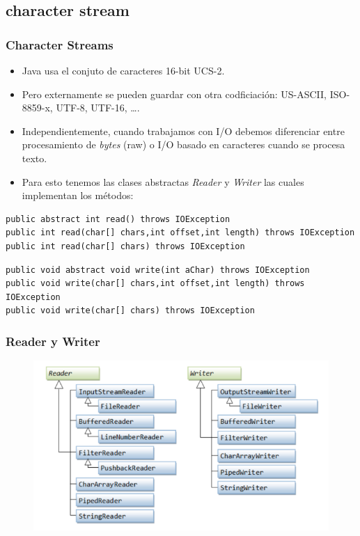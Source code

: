 \documentclass{beamer}
\begin{document}
\subsection{character stream}
\begin{frame}[fragile]
\frametitle{Character Streams}
\begin{itemize}[<+->]
\item Java usa el conjuto de caracteres 16-bit UCS-2.
\item Pero externamente se pueden guardar con otra codficiación:  US-ASCII, ISO-8859-x, UTF-8, UTF-16, \dots.
\item Independientemente, cuando trabajamos con I/O debemos diferenciar entre procesamiento de \emph{bytes} (raw) o I/O basado en caracteres cuando se procesa texto.
\item Para esto tenemos las clases abstractas \emph{Reader} y \emph{Writer} las cuales implementan los métodos:
\end{itemize}
\pause
\begin{footnotesize}
\begin{verbatim}
public abstract int read() throws IOException
public int read(char[] chars,int offset,int length) throws IOException
public int read(char[] chars) throws IOException
\end{verbatim}
\pause
\begin{verbatim}
public void abstract void write(int aChar) throws IOException
public void write(char[] chars,int offset,int length) throws IOException
public void write(char[] chars) throws IOException
\end{verbatim}
\end{footnotesize}
\end{frame}

\begin{frame}
\frametitle{Reader y Writer}
\begin{figure}
\includegraphics[scale=0.6]{imagenes/rw.png}
\end{figure}
\end{frame}
\end{document}
